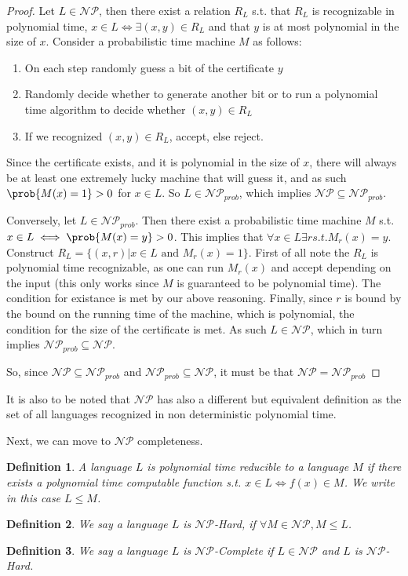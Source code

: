 \documentclass{article}
\newtheorem{definition}{Definition}
\begin{document}
\begin{proof}
Let $L \in \mathcal{NP}$, then there exist a relation $R_L$ s.t. that $R_L$ is recognizable in polynomial time, $x \in L \iff \exists (x, y) \in R_L$ and that $y$ is at most polynomial in the size of $x$. Consider a probabilistic time machine $M$ as follows: 
\begin{enumerate}
    \item On each step randomly guess a bit of the certificate $y$
    \item Randomly decide whether to generate another bit or to run a polynomial time algorithm to decide whether $(x, y) \in R_L$
    \item If we recognized $(x, y) \in R_L$, accept, else reject. 
\end{enumerate}

Since the certificate exists, and it is polynomial in the size of $x$, there will always be at least one extremely lucky machine that will guess it, and as such $\prob{M(x) = 1} > 0$ for $x \in L$. So $L \in \mathcal{NP}_{prob}$, which implies $\mathcal{NP} \subseteq \mathcal{NP}_{prob}$. 

Conversely, let $L \in \mathcal{NP}_{prob}$. Then there exist a probabilistic time machine $M$ s.t. $x \in L \iff \prob{M(x) = y} > 0$. This implies that $\forall x \in L\exists r s.t. M_r(x) = y$. Construct $R_L = \{ (x, r) | x \in L \text { and } M_r(x) = 1 \}$. First of all note the $R_L$ is polynomial time recognizable, as one can run $M_r(x)$ and accept depending on the input (this only works since $M$ is guaranteed to be polynomial time). The condition for existance is met by our above reasoning. Finally, since $r$ is bound by the bound on the running time of the machine, which is polynomial, the condition for the size of the certificate is met. As such $L \in \mathcal{NP}$, which in turn implies $\mathcal{NP}_{prob} \subseteq \mathcal{NP}$. \par

So, since $\mathcal{NP} \subseteq \mathcal{NP}_{prob}$ and $\mathcal{NP}_{prob} \subseteq \mathcal{NP}$, it must be that $\mathcal{NP} = \mathcal{NP}_{prob}$


\end{proof}

It is also to be noted that $\mathcal{NP}$ has also a different but equivalent definition as the set of all languages recognized in non deterministic polynomial time. \par

Next, we can move to $\mathcal{NP}$ completeness. 
\begin{definition}
A language $L$ is polynomial time reducible to a language $M$ if there exists a polynomial time computable function s.t. $x \in L \iff f(x) \in M$. We write in this case $L \leq M$.
\end{definition}
\begin{definition}
We say a language $L$ is $\mathcal{NP}$-Hard, if $\forall M \in \mathcal{NP}, M \leq L$.
\end{definition}
\begin{definition}
We say a language $L$ is $\mathcal{NP}$-Complete if $L \in \mathcal{NP}$ and $L$ is $\mathcal{NP}$-Hard.
\end{definition}
\end{document}
